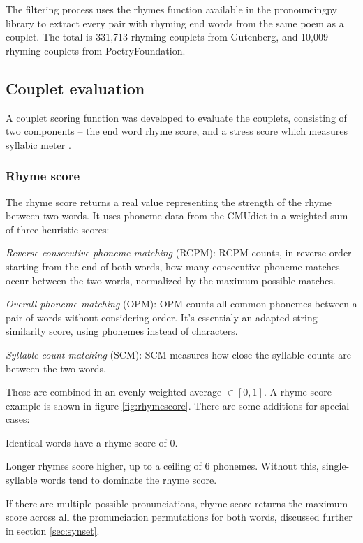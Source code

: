 \documentclass[11pt,a4paper]{article}
\newenvironment{tight_enumerate}{
\begin{enumerate}
\setlength{\itemsep}{0pt}
\setlength{\parskip}{0pt}
}{\end{enumerate}}
\newenvironment{tight_itemize}{
\begin{itemize}
\setlength{\itemsep}{0pt}
\setlength{\parskip}{0pt}
}{\end{itemize}}
\begin{document}
The filtering process uses the rhymes function available in the pronouncingpy library to extract every pair with rhyming end words from the same poem as a couplet. The total is 331,713 rhyming couplets from Gutenberg, and 10,009 rhyming couplets from PoetryFoundation.

\subsection{Couplet evaluation}
\label{sec:coupleteval}

A couplet scoring function was developed to evaluate the couplets, consisting of two components -- the end word rhyme score, and a stress score which measures syllabic meter \cite{meter_def}.

\subsubsection{Rhyme score}
\label{sec:rhymescore}

The rhyme score returns a real value representing the strength of the rhyme between two words. It uses phoneme data from the CMUdict in a weighted sum of three heuristic scores:
\begin{tight_itemize}
	\vspace{-0.5em}
	\item \textit{Reverse consecutive phoneme matching} (RCPM):
	RCPM counts, in reverse order starting from the end of both words, how many consecutive phoneme matches occur between the two words, normalized by the maximum possible matches.
	\item \textit{Overall phoneme matching} (OPM):
		OPM counts all common phonemes between a pair of words without considering order. It's essentialy an adapted \citet{ratcliff} string similarity score, using phonemes instead of characters.
	\item \textit{Syllable count matching} (SCM):
	SCM measures how close the syllable counts are between the two words.
\end{tight_itemize}

These are combined in an evenly weighted average $\in [0, 1]$. A rhyme score example is shown in figure \ref{fig:rhymescore}. There are some additions for special cases:
\begin{tight_enumerate}
	\vspace{-0.5em}
	\item
		Identical words have a rhyme score of 0.
	\item
		Longer rhymes score higher, up to a ceiling of 6 phonemes. Without this, single-syllable words tend to dominate the rhyme score.
	\item
		If there are multiple possible pronunciations, rhyme score returns the maximum score across all the pronunciation permutations for both words, discussed further in section \ref{sec:synset}.
\end{tight_enumerate}
\end{document}
